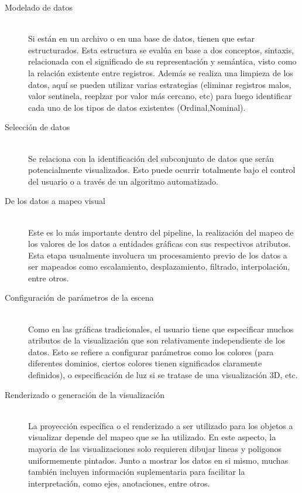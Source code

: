 \documentclass[12pt]{article}
\begin{document}
\begin{description}
	\item[Modelado de datos] \hfil \\
Si están en un archivo o en una base de datos, tienen que estar  estructurados. Esta estructura se evalúa en base a dos conceptos, sintaxis, relacionada con el significado de su representación y semántica, visto como la relación existente entre registros. Además se realiza una limpieza de los datos, aquí se pueden utilizar varias estrategias (eliminar registros malos, valor sentinela, reeplzar por valor más cercano, etc) para luego identificar cada uno de los tipos de datos existentes (Ordinal,Nominal).

	
	\item[Selección de datos] \hfill \\
Se relaciona con la identificación del subconjunto de datos que serán potencialmente visualizados. Esto puede ocurrir totalmente bajo el control del usuario o a través de un algoritmo automatizado.

	\item[De los datos a mapeo visual] \hfill \\
Este es lo más importante dentro del pipeline, la realización del mapeo de los valores de los datos a entidades gráficas con  sus respectivos atributos. Esta etapa usualmente involucra un procesamiento previo de los datos a ser mapeados como escalamiento, desplazamiento, filtrado, interpolación, entre otros.

	\item[Configuración de parámetros de la escena] \hfill \\
Como en las gráficas tradicionales, el usuario tiene que especificar muchos atributos de la visualización que son relativamente independiente de los datos. Esto se refiere a configurar parámetros como los colores (para diferentes dominios, ciertos colores tienen significados claramente definidos), o especificación de luz si se tratase de una visualización 3D, etc.

	\item[Renderizado o generación de la visualización] \hfill \\
La proyección específica o el renderizado a ser utilizado para los objetos a visualizar depende del mapeo que se ha utilizado. En este aspecto, la mayoria de las visualizaciones solo requieren dibujar lineas y poligonos uniformemente pintados. Junto a mostrar los datos en si mismo, muchas también incluyen información suplementaria para facilitar la interpretación, como ejes, anotaciones, entre otros.

\end{description}
\end{document}
